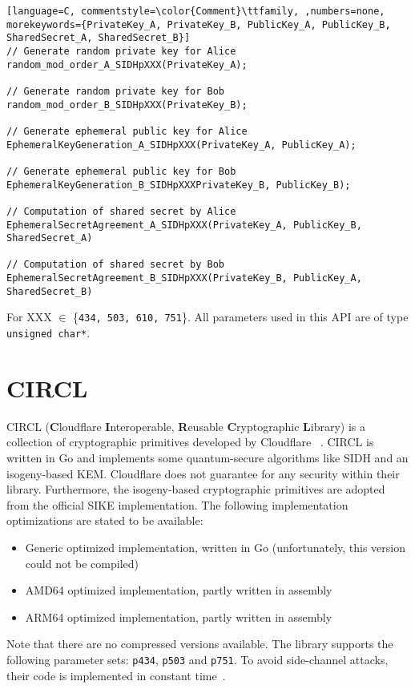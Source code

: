 \begin{lstlisting}[language=C, commentstyle=\color{Comment}\ttfamily, ,numbers=none, morekeywords={PrivateKey_A, PrivateKey_B, PublicKey_A, PublicKey_B, SharedSecret_A, SharedSecret_B}]
// Generate random private key for Alice
random_mod_order_A_SIDHpXXX(PrivateKey_A);

// Generate random private key for Bob
random_mod_order_B_SIDHpXXX(PrivateKey_B);

// Generate ephemeral public key for Alice
EphemeralKeyGeneration_A_SIDHpXXX(PrivateKey_A, PublicKey_A);

// Generate ephemeral public key for Bob
EphemeralKeyGeneration_B_SIDHpXXXPrivateKey_B, PublicKey_B);

// Computation of shared secret by Alice
EphemeralSecretAgreement_A_SIDHpXXX(PrivateKey_A, PublicKey_B, SharedSecret_A)

// Computation of shared secret by Bob
EphemeralSecretAgreement_B_SIDHpXXX(PrivateKey_B, PublicKey_A, SharedSecret_B)

\end{lstlisting}
For XXX $\in$ \{\texttt{434, 503, 610, 751}\}. All parameters used in this API are of type \texttt{unsigned char*}.

\section{\gls{CIRCL}}

\gls{CIRCL} (\textbf{C}loudflare \textbf{I}nteroperable, \textbf{R}eusable \textbf{C}ryptographic \textbf{L}ibrary) is a collection of cryptographic primitives developed by Cloudflare ~\parencite{circl2020github}. \gls{CIRCL} is written in Go and implements some quantum-secure algorithms like \gls{SIDH} and an isogeny-based \gls{KEM}. Cloudflare does not guarantee for any security within their library. Furthermore, the isogeny-based cryptographic primitives are adopted from the official \gls{SIKE} implementation. The following implementation optimizations are stated to be available:

\begin{itemize}
  \item Generic optimized implementation, written in Go (unfortunately, this version could not be compiled)
  \item AMD64 optimized implementation, partly written in assembly
  \item ARM64 optimized implementation, partly written in assembly
\end{itemize}
Note that there are no compressed versions available. The library supports the following parameter sets: \texttt{p434}, \texttt{p503} and \texttt{p751}. To avoid side-channel attacks, their code is implemented in constant time~\parencite{circl2019intro}.

